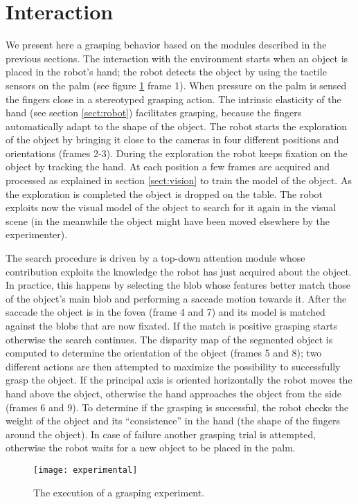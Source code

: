 \section{Interaction}
\label{sect:exp}

We present here a grasping behavior based on the modules described in the previous sections. The interaction with the environment starts when an object is placed in the robot's hand; the robot detects the object by using the tactile sensors on the palm (see figure \ref{fig-experiment} frame 1). When pressure on the palm is sensed the fingers close in a stereotyped grasping action. The intrinsic elasticity of the hand (see section \ref{sect:robot}) facilitates grasping, because the fingers automatically adapt to the shape of the object. The robot starts the exploration of the object by bringing it close to the cameras in four different positions and orientations (frames 2-3). During the exploration the robot keeps fixation on the object by tracking the hand. At each position a few frames are acquired and processed as explained in section \ref{sect:vision} to train the model of the object. As the exploration is completed the object is dropped on the table. The robot exploits now the visual model of the object to search for it again in the visual scene (in the meanwhile the object might have been moved elsewhere by the experimenter).

The search procedure is driven by a top-down attention module whose contribution exploits the knowledge the robot has just acquired about the object. In practice, this happens by selecting the blob whose features better match those of the object's main blob and performing a saccade motion towards it. After the saccade the object is in the fovea (frame 4 and 7) and its model is matched against the blobs that are now fixated. If the match is positive grasping starts otherwise the search continues. The disparity map of the segmented object is computed to determine the orientation of the object (frames 5 and 8); two different actions are then attempted to maximize the possibility to successfully grasp the object. If the principal axis is oriented horizontally the robot moves the hand above the object, otherwise the hand approaches the object from the side (frames 6 and 9). To determine if the grasping is successful, the robot checks the weight of the object and its ``consistence'' in the hand (the shape of the fingers around the object). In case of failure another grasping trial is attempted, otherwise the robot waits for a new object to be placed in the palm.

\begin{figure}
\centering
\texttt{[image: experimental]}
\caption{The execution of a grasping experiment.}
\label{fig-experiment}
\end{figure}
